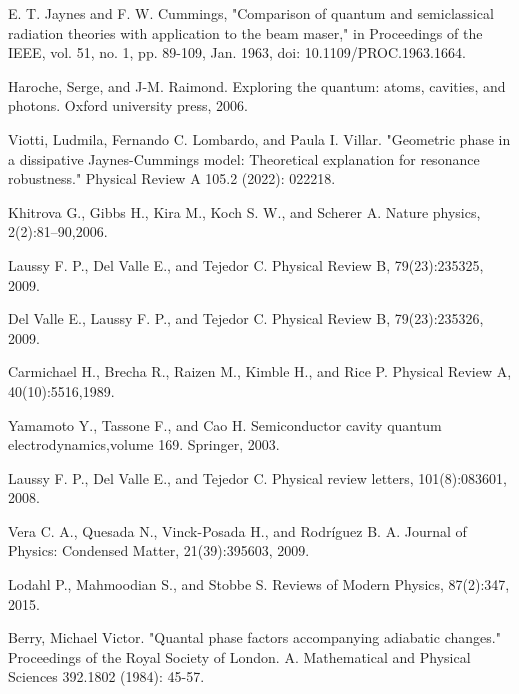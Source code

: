 \label{ch:referencias}
\renewcommand\bibname{Referencias}


%



\begin{thebibliography}{9}



E. T. Jaynes and F. W. Cummings, "Comparison of quantum and semiclassical radiation theories with application to the beam maser," in Proceedings of the IEEE, vol. 51, no. 1, pp. 89-109, Jan. 1963, doi: 10.1109/PROC.1963.1664.

Haroche, Serge, and J-M. Raimond. Exploring the quantum: atoms, cavities, and photons. Oxford university press, 2006.

Viotti, Ludmila, Fernando C. Lombardo, and Paula I. Villar. "Geometric phase in a dissipative Jaynes-Cummings model: Theoretical explanation for resonance robustness." Physical Review A 105.2 (2022): 022218.

Khitrova G., Gibbs H., Kira M., Koch S. W., and Scherer A. Nature physics, 2(2):81–90,2006.

Laussy F. P., Del Valle E., and Tejedor C. Physical Review B, 79(23):235325, 2009.

 Del Valle E., Laussy F. P., and Tejedor C. Physical Review B, 79(23):235326, 2009.

Carmichael H., Brecha R., Raizen M., Kimble H., and Rice P. Physical Review A, 40(10):5516,1989.

Yamamoto Y., Tassone F., and Cao H. Semiconductor cavity quantum electrodynamics,volume 169. Springer, 2003.

Laussy F. P., Del Valle E., and Tejedor C. Physical review letters, 101(8):083601, 2008.

 Vera C. A., Quesada N., Vinck-Posada H., and Rodríguez B. A. Journal of Physics: Condensed Matter, 21(39):395603, 2009.

Lodahl P., Mahmoodian S., and Stobbe S. Reviews of Modern Physics, 87(2):347, 2015.


Berry, Michael Victor. "Quantal phase factors accompanying adiabatic changes." Proceedings of the Royal Society of London. A. Mathematical and Physical Sciences 392.1802 (1984): 45-57.


\end{thebibliography}
